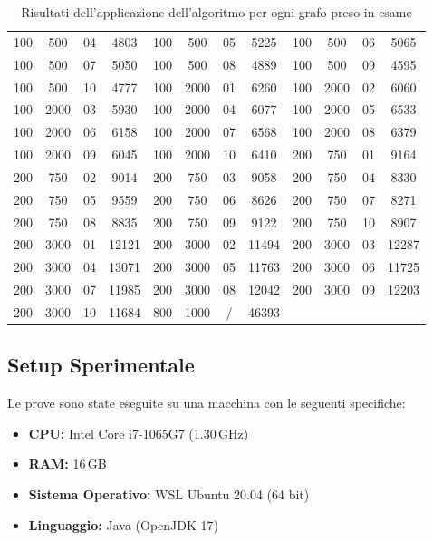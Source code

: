 \begin{table}[h]
\begin{tabular}{cccc||cccc||cccc}
        100 & 500  & 04 & 4803 & 100 & 500  & 05 & 5225 & 100 & 500  & 06 & 5065 \\
        100 & 500  & 07 & 5050 & 100 & 500  & 08 & 4889 & 100 & 500  & 09 & 4595 \\
        100 & 500  & 10 & 4777 & 100 & 2000 & 01 & 6260 & 100 & 2000 & 02 & 6060 \\
        100 & 2000 & 03 & 5930 & 100 & 2000 & 04 & 6077 & 100 & 2000 & 05 & 6533 \\
        100 & 2000 & 06 & 6158 & 100 & 2000 & 07 & 6568 & 100 & 2000 & 08 & 6379 \\
        100 & 2000 & 09 & 6045 & 100 & 2000 & 10 & 6410 & 200 & 750  & 01 & 9164 \\
        200 & 750  & 02 & 9014 & 200 & 750  & 03 & 9058 & 200 & 750  & 04 & 8330 \\
        200 & 750  & 05 & 9559 & 200 & 750  & 06 & 8626 & 200 & 750  & 07 & 8271 \\
        200 & 750  & 08 & 8835 & 200 & 750  & 09 & 9122 & 200 & 750  & 10 & 8907 \\
        \hline\hline
        200 & 3000 & 01 & 12121 & 200 & 3000 & 02 & 11494 & 200 & 3000 & 03 & 12287 \\
        200 & 3000 & 04 & 13071 & 200 & 3000 & 05 & 11763 & 200 & 3000 & 06 & 11725 \\
        200 & 3000 & 07 & 11985 & 200 & 3000 & 08 & 12042 & 200 & 3000 & 09 & 12203 \\
        200 & 3000 & 10 & 11684 & 800 & 1000 & /  & 46393 &     &      &    &      \\
        \bottomrule
    \end{tabular}
    \caption{Risultati dell'applicazione dell'algoritmo per ogni grafo preso in esame}
    \label{tab:results}
\end{table}

\subsection{Setup Sperimentale}

Le prove sono state eseguite su una macchina con le seguenti specifiche:
\begin{itemize}
    \item \textbf{CPU:} Intel Core i7-1065G7 (1.30\,GHz)
    \item \textbf{RAM:} 16\,GB
    \item \textbf{Sistema Operativo:} WSL Ubuntu 20.04 (64 bit)
    \item \textbf{Linguaggio:} Java (OpenJDK 17)
\end{itemize}

